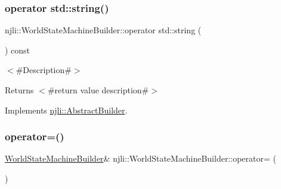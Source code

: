 \subsubsection{\texorpdfstring{operator std\+::string()}{operator std::string()}}
{\footnotesize\ttfamily njli\+::\+World\+State\+Machine\+Builder\+::operator std\+::string (\begin{DoxyParamCaption}{ }\end{DoxyParamCaption}) const\hspace{0.3cm}{\ttfamily [virtual]}}

$<$\#\+Description\#$>$

\begin{DoxyReturn}{Returns}
$<$\#return value description\#$>$ 
\end{DoxyReturn}


Implements \mbox{\hyperlink{classnjli_1_1_abstract_builder_a3e6e553e06d1ca30517ad5fb0bd4d000}{njli\+::\+Abstract\+Builder}}.

\mbox{\label{classnjli_1_1_world_state_machine_builder_a33cabbf4b869f923dbb385a99ef8bf9f}} 
\subsubsection{\texorpdfstring{operator=()}{operator=()}}
{\footnotesize\ttfamily \mbox{\hyperlink{classnjli_1_1_world_state_machine_builder}{World\+State\+Machine\+Builder}}\& njli\+::\+World\+State\+Machine\+Builder\+::operator= (\begin{DoxyParamCaption}\item[{const \mbox{\hyperlink{classnjli_1_1_world_state_machine_builder}{World\+State\+Machine\+Builder}} \&}]{ }\end{DoxyParamCaption})\hspace{0.3cm}{\ttfamily [protected]}}

\mbox{\label{classnjli_1_1_world_state_machine_builder_a46fce2e29eb63256187533c4abb4bb53}} 
